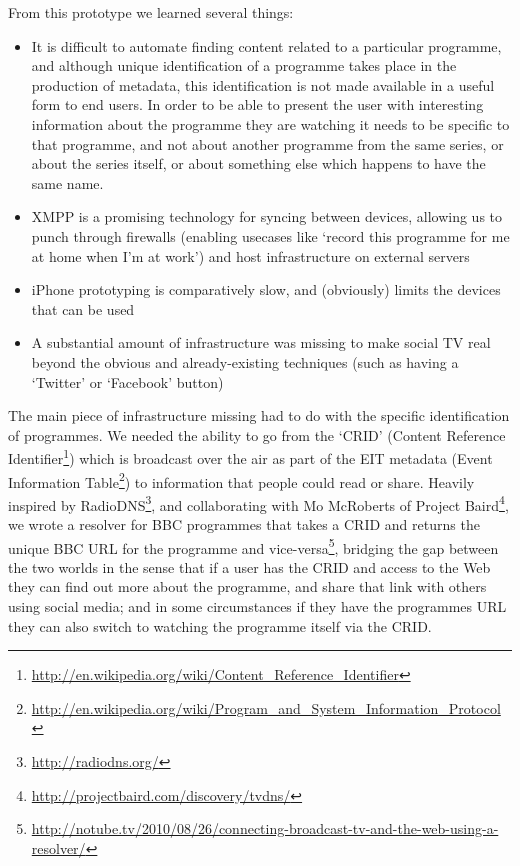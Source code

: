 \documentclass{notube}
\begin{document}
From this prototype we learned several things:

\begin{itemize}
\item{It is difficult to automate finding content related to a particular programme, and although unique identification of a programme takes place in the production of metadata, this identification is not made available in a useful form to end users. In order to be able to present the user with interesting information about the programme they are watching it needs to be specific to that programme, and not about another programme from the same series, or about the series itself, or about something else which happens to have the same name.}
\item{XMPP is a promising technology for syncing between devices, allowing us to punch through firewalls (enabling usecases like `record this programme for me at home when I'm at work') and host infrastructure on external servers}
\item{iPhone prototyping is comparatively slow, and (obviously) limits the devices that can be used}
\item{A substantial amount of infrastructure was missing to make social TV real beyond the obvious and already-existing techniques (such as having a `Twitter' or `Facebook' button)}
\end{itemize}

The main piece of infrastructure missing had to do with the specific identification of programmes. We needed the ability to go from the `CRID' (Content Reference Identifier\footnote{\url{http://en.wikipedia.org/wiki/Content_Reference_Identifier}}) which is broadcast over the air as part of the EIT metadata (Event Information Table\footnote{\url{http://en.wikipedia.org/wiki/Program_and_System_Information_Protocol}}) to information that people could read or share. Heavily inspired by RadioDNS\footnote{\url{http://radiodns.org/}}, and collaborating with Mo McRoberts of Project Baird\footnote{\url{http://projectbaird.com/discovery/tvdns/}}, we wrote a resolver for BBC programmes that takes a CRID and returns the unique BBC URL for the programme and vice-versa\footnote{\url{http://notube.tv/2010/08/26/connecting-broadcast-tv-and-the-web-using-a-resolver/}}, bridging the gap between the two worlds in the sense that if a user has the CRID and access to the Web they can find out more about the programme, and share that link with others using social media; and in some circumstances if they have the programmes URL they can also switch to watching the programme itself via the CRID.
\\
\end{document}
